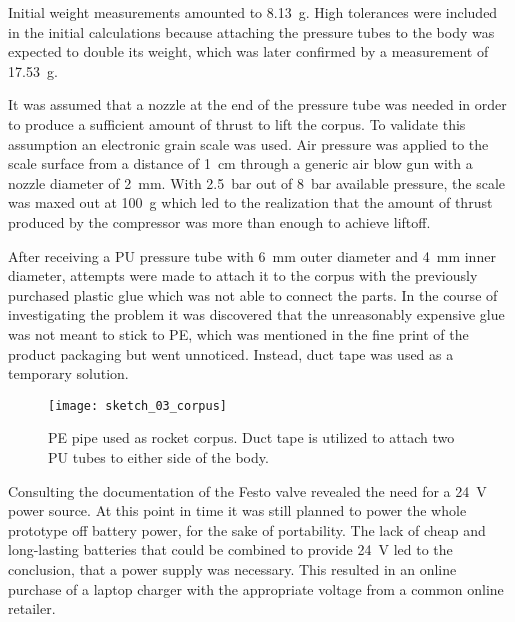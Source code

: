 Initial weight measurements amounted to \SI{8,13}{\gram}. High tolerances were included in the initial calculations because attaching the pressure tubes to the body was expected to double its weight, which was later confirmed by a measurement of \SI{17,53}{\gram}.

It was assumed that a nozzle at the end of the pressure tube was needed in order to produce a sufficient amount of thrust to lift the corpus.
To validate this assumption an electronic grain scale was used. Air pressure was applied to the scale surface from a distance of \SI{1}{\centi\meter} through a generic air blow gun with a nozzle diameter of \SI{2}{\milli\meter}. With \SI{2,5}{\bar} out of \SI{8}{\bar} available pressure, the scale was maxed out at \SI{100}{\gram} which led to the realization that the amount of thrust produced by the compressor was more than enough to achieve liftoff. 


After receiving a PU pressure tube with \SI{6}{\milli\meter} outer diameter and \SI{4}{\milli\meter} inner diameter, attempts were made to attach it to the corpus with the previously purchased plastic glue which was not able to connect the parts. In the course of investigating the problem it was discovered that the unreasonably expensive glue was not meant to stick to PE, which was mentioned in the fine print of the product packaging but went unnoticed. Instead, duct tape was used as a temporary solution. 

\begin{figure}[h]
\centering

\texttt{[image: sketch\_03\_corpus]}

\caption{PE pipe used as rocket corpus. Duct tape is utilized to attach two PU tubes to either side of the body.}
\end{figure}

Consulting the documentation of the Festo valve revealed the need for a \SI{24}{\volt} power source. At this point in time it was still planned to power the whole prototype off battery power, for the sake of portability. The lack of cheap and long-lasting batteries that could be combined to provide \SI{24}{\volt} led to the conclusion, that a power supply was necessary. This resulted in an online purchase of a laptop charger \cite{power-supply} with the appropriate voltage from a common online retailer.

